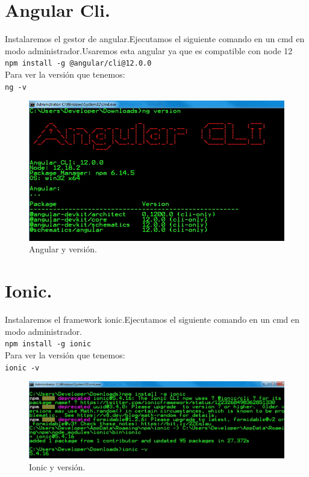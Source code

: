 \section{Angular Cli.}
Instalaremos el gestor de angular.Ejecutamos el siguiente comando en un cmd en modo administrador.Usaremos esta angular ya que es compatible con node 12\\
\texttt{npm install -g @angular/cli@12.0.0}\\
Para ver la versi\'on que tenemos:\\
\texttt{ng -v}\\
\begin{figure}[H] %
	\centering %
	\includegraphics[scale=0.7]{images/c1_4.jpg}
	\caption{Angular y versi\'on.}
\end{figure}

\section{Ionic.}
Instalaremos el framework ionic.Ejecutamos el siguiente comando en un cmd en modo administrador.\\
\texttt{npm install -g ionic}\\
Para ver la versi\'on que tenemos:\\
\texttt{ionic -v}\\
\begin{figure}[H] %
	\centering %
	\includegraphics[scale=0.7]{images/c1_5.jpg}
	\caption{Ionic  y versi\'on.}
\end{figure}

